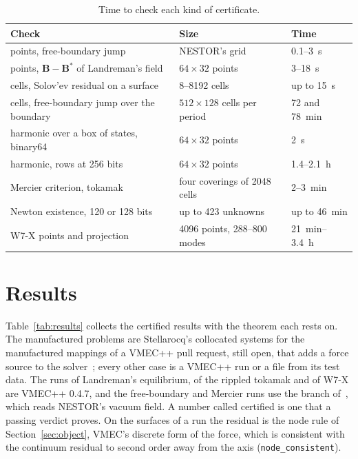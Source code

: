 \documentclass[11pt]{article}
\newcommand{\code}[1]{\texttt{#1}}
\begin{document}
\begin{table}[t]
\centering\small
\begin{tabular}{@{}lll@{}}
\hline
Check & Size & Time \\
\hline
points, free-boundary jump & NESTOR's grid & 0.1--3~s \\
points, $\mathbf{B}-\mathbf{B}^*$ of Landreman's field & $64\times32$ points & 3--18~s \\
cells, Solov'ev residual on a surface & 8--8192 cells & up to 15~s \\
cells, free-boundary jump over the boundary & $512\times128$ cells per period & 72 and 78~min \\
harmonic over a box of states, binary64 & $64\times32$ points & 2~s \\
harmonic, rows at 256 bits & $64\times32$ points & 1.4--2.1~h \\
Mercier criterion, tokamak & four coverings of 2048 cells & 2--3~min \\
Newton existence, 120 or 128 bits & up to 423 unknowns & up to 46~min \\
W7-X points and projection & 4096 points, 288--800 modes & 21~min--3.4~h \\
\hline
\end{tabular}
\caption{Time to check each kind of certificate.}\label{tab:cost}
\end{table}

\section{Results}\label{sec:results}

Table~\ref{tab:results} collects the certified results with the theorem each
rests on. The manufactured problems are Stellarocq's collocated systems for the
manufactured mappings of a VMEC++ pull request, still open, that adds a force
source to the solver~\cite{pr784}; every other case is a VMEC++ run or a file
from its test data. The runs of Landreman's equilibrium, of the rippled tokamak
and of W7-X are VMEC++ 0.4.7, and the free-boundary and Mercier runs use the
branch of~\cite{branch}, which reads NESTOR's vacuum field. A number called
certified is one that a passing verdict proves. On the surfaces of a run the
residual is the node rule of Section~\ref{sec:object}, VMEC's discrete form of
the force, which is consistent with the continuum residual to second order away
from the axis (\code{node\_consistent}).
\end{document}
